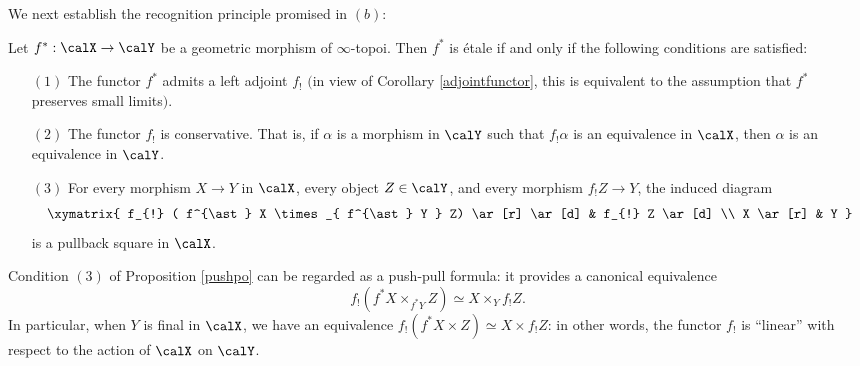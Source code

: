 We next establish the recognition principle promised in $(b)$:

\begin{proposition}\label{pushpo}
Let $f^{\ast}: \calX \rightarrow \calY$ be a geometric morphism of $\infty$-topoi. Then
$f^{\ast}$ is \'{e}tale if and only if the following conditions are satisfied:
\begin{itemize}
\item[$(1)$] The functor $f^{\ast}$ admits a left adjoint $f_{!}$ $($in view of Corollary \ref{adjointfunctor}, this is equivalent to the assumption that $f^{\ast}$ preserves small limits$)$.
\item[$(2)$] The functor $f_{!}$ is conservative. That is, if $\alpha$ is a morphism in $\calY$ such
that $f_{!} \alpha$ is an equivalence in $\calX$, then $\alpha$ is an equivalence in $\calY$.
\item[$(3)$] For every morphism $X \rightarrow Y$ in $\calX$, every object $Z \in \calY$, and
every morphism $f_{!} Z \rightarrow Y$, the induced diagram
$$ \xymatrix{ f_{!} ( f^{\ast} X \times_{ f^{\ast} Y } Z) \ar[r] \ar[d] & f_{!} Z \ar[d] \\
X \ar[r] & Y }$$
is a pullback square in $\calX$.
\end{itemize}
\end{proposition}

\begin{remark}
Condition $(3)$ of Proposition \ref{pushpo} can be regarded as a push-pull formula: it provides a canonical equivalence
$$ f_{!}( f^{\ast} X \times_{ f^{\ast} Y} Z) \simeq X \times_{Y} f_{!} Z.$$
In particular, when $Y$ is final in $\calX$, we have an equivalence
$f_{!}( f^{\ast} X \times Z) \simeq X \times f_{!} Z$: in other words, the functor
$f_{!}$ is ``linear'' with respect to the action of $\calX$ on $\calY$.
\end{remark}

